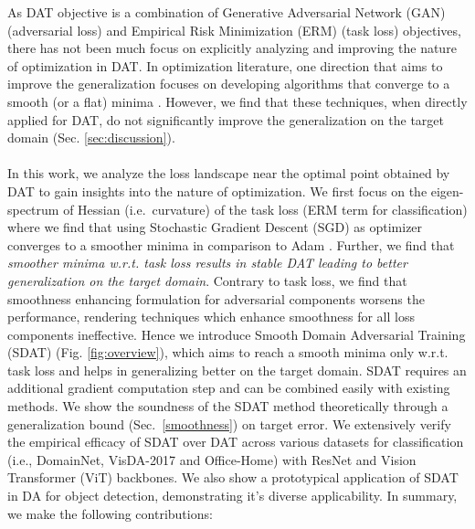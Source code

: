 \documentclass[table,dvipsnames]{article}
\theoremstyle{plain}
\theoremstyle{definition}
\theoremstyle{remark}
\begin{document}
As DAT objective is a combination of Generative Adversarial Network (GAN) \citep{goodfellow2014generative} (adversarial loss)  and Empirical Risk Minimization (ERM) \citep{vapnik2013nature} (task loss) objectives, there has not been much focus on explicitly analyzing and improving the nature of optimization in DAT. In optimization literature, one direction that aims to improve the generalization focuses on developing algorithms that converge to a smooth (or a flat) minima \citep{foret2021sharpnessaware, keskar2017improving}. However, we find that these techniques, when directly applied for DAT, do not significantly improve the generalization on the target domain (Sec. \ref{sec:discussion}). \\ \\
In this work, we analyze the loss landscape near the optimal point obtained by DAT to gain insights into the nature of optimization. We first focus on the eigen-spectrum of Hessian (i.e.\ curvature) of the  {task loss (ERM term for classification)} where we find that using Stochastic Gradient Descent (SGD) as optimizer converges to a smoother minima in comparison to Adam \citep{kingma2014adam}. Further, we find that \textit{smoother minima w.r.t. {task} loss results in stable DAT leading to better generalization on the target domain}. Contrary to {task} loss, we find that smoothness enhancing formulation for adversarial components worsens the performance, rendering techniques \cite{cha2021swad} which enhance smoothness for all loss components ineffective. Hence we introduce Smooth Domain Adversarial Training (SDAT) (Fig. \ref{fig:overview}), which aims to reach a smooth minima only w.r.t. task loss and helps in generalizing better on the target domain. SDAT requires an additional gradient computation step and can be combined easily with existing methods. 
We show the soundness of the SDAT method theoretically through a generalization bound (Sec.\ \ref{smoothness}) on target error. We extensively verify the empirical efficacy of SDAT over DAT across various datasets for classification (i.e., DomainNet, VisDA-2017 and Office-Home) with ResNet and Vision Transformer \cite{dosovitskiy2020image} (ViT) backbones. We also show a prototypical application of SDAT in DA for object detection, demonstrating it's diverse applicability. In summary, we make the following contributions:
\end{document}

